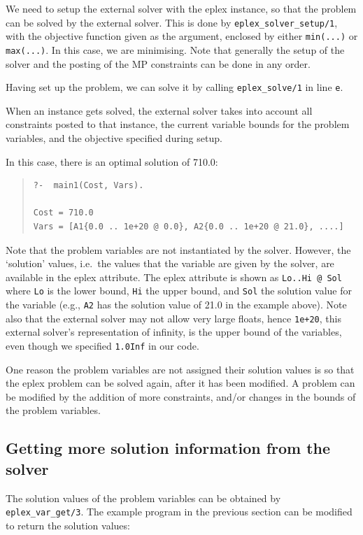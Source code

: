 We need to setup the external solver with the eplex instance, so
that the problem can be solved by the external solver. This is done by
\verb'eplex_solver_setup/1', with the objective
function given as the argument, enclosed by either \verb'min(...)' or \verb'max(...)'. In this case, we are minimising.
Note that
generally the setup of the solver and the posting of the MP constraints can be
done in any order.

Having set up the problem, we can solve it
by calling \verb'eplex_solve/1' in line \verb'e'. 

When an instance gets solved, the external solver takes into account all
constraints posted to that instance, the current variable bounds for the
problem variables, and the objective specified during setup.

In this case, there is an optimal solution of 710.0:

\begin{quote}\begin{verbatim}
?-  main1(Cost, Vars).

Cost = 710.0
Vars = [A1{0.0 .. 1e+20 @ 0.0}, A2{0.0 .. 1e+20 @ 21.0}, ....]
\end{verbatim}\end{quote}
Note that the problem variables are not
instantiated by the solver. However, the `solution' values, i.e.\ the
values that the variable are given by the solver, are available in the
eplex attribute. The eplex attribute is shown as \verb'Lo..Hi @ Sol' where
\verb'Lo' is the lower bound, \verb'Hi' the upper bound, and \verb'Sol' the
solution value for the variable (e.g., \verb'A2' has the solution value of
21.0 in the example above). Note also that the external solver may not
allow very large floats, hence \verb'1e+20', this external solver's
representation of infinity, is the upper bound of the
variables, even though we specified \verb'1.0Inf' in our code. 

One reason the problem variables are not assigned their solution values is
so that the eplex problem can be solved again, after it has been modified.
A problem can be modified by the addition of more constraints, and/or
changes in the bounds of the problem variables.

\subsection{Getting more solution information from the solver}

The solution values of the problem variables can be obtained by
\verb'eplex_var_get/3'. The example program in the
previous section can be modified to return the solution values:

